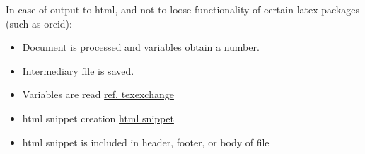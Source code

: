 \documentclass[
  letterpaper,
  DIV=11,
  numbers=noendperiod]{scrreprt}
\providecommand{\tightlist}{%
  \setlength{\itemsep}{0pt}\setlength{\parskip}{0pt}}\usepackage{longtable,booktabs,array}
\begin{document}
In case of output to html, and not to loose functionality of certain
latex packages (such as orcid):

\begin{itemize}
\tightlist
\item
  Document is processed and variables obtain a number.
\item
  Intermediary file is saved.
\item
  Variables are read
  \href{https://tex.stackexchange.com/questions/321346/how-to-read-a-variable-from-a-file-in-latex}{ref.
  texexchange}
\item
  html snippet creation \href{https://texfaq.org/FAQ-LaTeX2HTML}{html
  snippet}
\item
  html snippet is included in header, footer, or body of file
\end{itemize}
\end{document}
